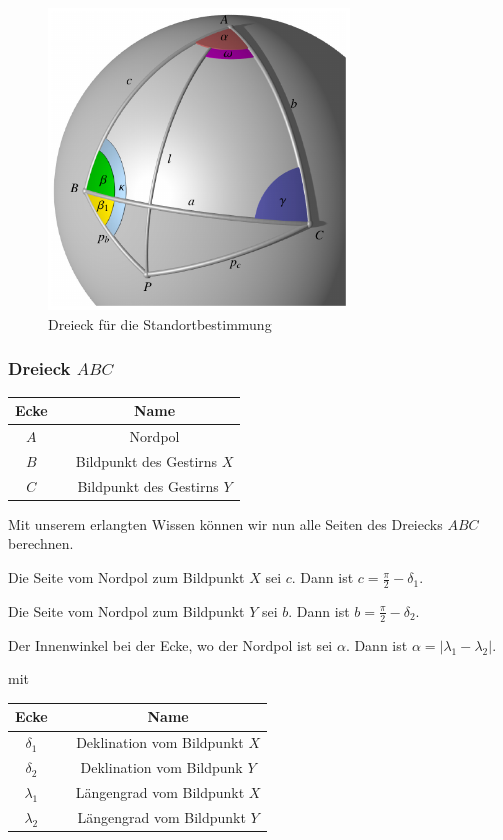\begin{figure}
	\begin{center}
		\includegraphics[width=8cm]{papers/nav/bilder/dreieck.pdf}
		\caption[Dreieck für die Standortbestimmung]{Dreieck für die Standortbestimmung}
	\end{center}
\end{figure}


\subsubsection{Dreieck $ABC$}

\begin{center}
	\begin{tabular}{ c c c }
		Ecke && Name  \\ 
		\hline
		$A$ && Nordpol \\  
		$B$ && Bildpunkt des Gestirns $X$ \\
		$C$&& Bildpunkt des Gestirns $Y$
	\end{tabular}
\end{center}

Mit unserem erlangten Wissen können wir nun alle Seiten des Dreiecks $ABC$ berechnen.

Die Seite vom Nordpol zum Bildpunkt $X$ sei $c$.
Dann ist $c = \frac{\pi}{2} - \delta_1$. 

Die Seite vom Nordpol zum Bildpunkt $Y$ sei $b$.
Dann ist $b = \frac{\pi}{2} - \delta_2$. 

Der Innenwinkel bei der Ecke, wo der Nordpol ist sei $\alpha$.
Dann ist $ \alpha = |\lambda_1 - \lambda_2|$. 

mit 
\begin{center}
	\begin{tabular}{ c c c }
		Ecke && Name  \\ 
		\hline
		$\delta_1$ && Deklination vom Bildpunkt $X$ \\  
		$\delta_2$ && Deklination vom Bildpunk $Y$ \\
		$\lambda_1 $&& Längengrad vom Bildpunkt $X$\\
		$\lambda_2$ && Längengrad vom Bildpunkt $Y$
	\end{tabular}
\end{center}


